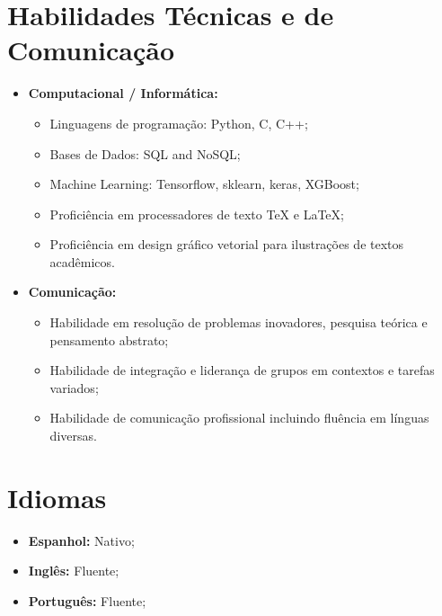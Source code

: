 \documentclass[11pt,a4paper,sans]{moderncv}        %
\begin{document}
\section{Habilidades Técnicas e de Comunicação}

\vspace{4pt}

\begin{itemize}

\item \textbf{Computacional / Informática:} 
\begin{itemize}
\item Linguagens de programação: Python, C, C++;
\item Bases de Dados: SQL and NoSQL;
\item Machine Learning: Tensorflow, sklearn, keras, XGBoost; 
\item Proficiência em processadores de texto TeX e LaTeX;
\item Proficiência em design gráfico vetorial para ilustrações de textos acadêmicos. 
\end{itemize}

\item \textbf{Comunicação:} 

\begin{itemize}
\item Habilidade em resolução de problemas inovadores, pesquisa teórica e pensamento abstrato;
\vspace{1pt}
\item Habilidade de integração e liderança de grupos em contextos e tarefas variados; 
\vspace{1pt}
\item Habilidade de comunicação profissional incluindo fluência em línguas diversas.

\end{itemize}

\end{itemize}

\section{Idiomas}
\vspace{4pt}
\begin{itemize}
\item{\textbf{Espanhol:}} Nativo;
\item{\textbf{Inglês:}} Fluente;
\item{\textbf{Português:}} Fluente;
\end{itemize}
\end{document}
